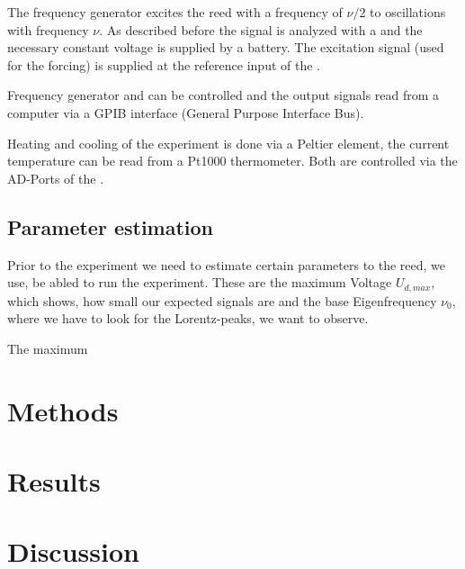 \documentclass[twoside, a4paper, DIV=11,twocolumn, 12pt]{book}
\begin{document}
The frequency generator excites the reed with a frequency of $\nu / 2$ to oscillations with frequency $\nu$. As described before the signal is analyzed with a \DLIA and the necessary constant voltage is supplied by a battery. The excitation signal (used for the forcing) is supplied at the reference input of the \LIA. 

Frequency generator and \LIA can be controlled and the output signals read from a computer via a GPIB interface (General Purpose Interface Bus).

Heating and cooling of the experiment is done via a Peltier element, the current temperature can be read from a Pt1000 thermometer. Both are controlled via the AD-Ports of the \LIAn.



\section{Parameter estimation}
\label{sec:par}

Prior to the experiment we need to estimate certain parameters to the reed, we use, be abled to run the experiment. These are the maximum Voltage $U_{d,max}$, which shows, 
how small our expected signals are and the base Eigenfrequency $\nu_0$, where we have to look for the Lorentz-peaks, we want to observe.


The maximum



\chapter{Methods}
\label{sec:meth}




\chapter{Results}
\label{sec:res}

\chapter{Discussion}
\label{sec:disk}


\onecolumn


\end{document}

